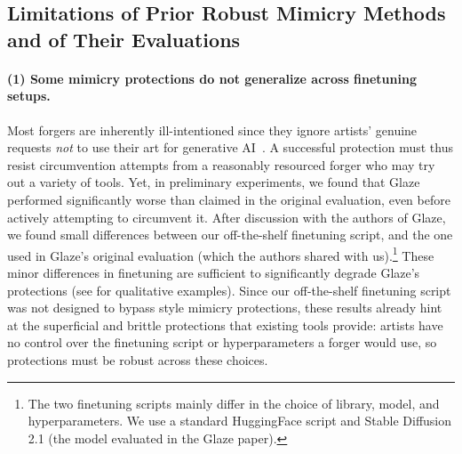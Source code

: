 \documentclass{article}
\begin{document}
\subsection{Limitations of Prior Robust Mimicry Methods and of Their Evaluations}
\label{sec:prot-limitations}

\paragraph{(1) Some mimicry protections do not generalize across finetuning setups.}\label{sec:glazebrittle} 
Most forgers are inherently ill-intentioned since they ignore artists' genuine requests \emph{not} to use their art for generative AI~\citep{heikkila2022artist}.
A successful protection must thus resist circumvention attempts from a reasonably resourced forger who may try out a variety of tools.
Yet, in preliminary experiments, we found that Glaze~\citep{glaze} performed significantly worse than claimed in the original evaluation, even before actively attempting to circumvent it.
After discussion with the authors of Glaze, we
found small differences between our off-the-shelf finetuning script, and the one used in Glaze's original evaluation (which the authors shared with us).\footnote{The two finetuning scripts mainly differ in the choice of library, model, and hyperparameters. We use a standard HuggingFace script and Stable Diffusion 2.1 (the model evaluated in the Glaze paper).}
These minor differences in finetuning are sufficient to significantly degrade Glaze's protections (see  for qualitative examples).
Since our off-the-shelf finetuning script was not designed to bypass style mimicry protections, these results already hint 
at the superficial and brittle protections that existing tools provide: artists have no control over the finetuning script or hyperparameters a forger would use, so protections must be robust across these choices.
\end{document}
